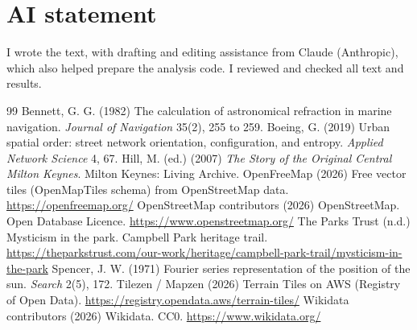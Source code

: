\documentclass[11pt,a4paper]{article}
\begin{document}
\section*{AI statement}
I wrote the text, with drafting and editing assistance from Claude (Anthropic), which also helped prepare the analysis code. I reviewed and checked all text and results.

\begin{thebibliography}{99}
 Bennett, G. G. (1982) The calculation of astronomical refraction in marine navigation. \textit{Journal of Navigation} 35(2), 255 to 259.
 Boeing, G. (2019) Urban spatial order: street network orientation, configuration, and entropy. \textit{Applied Network Science} 4, 67.
 Hill, M. (ed.) (2007) \textit{The Story of the Original Central Milton Keynes}. Milton Keynes: Living Archive.
 OpenFreeMap (2026) Free vector tiles (OpenMapTiles schema) from OpenStreetMap data. \url{https://openfreemap.org/}
 OpenStreetMap contributors (2026) OpenStreetMap. Open Database Licence. \url{https://www.openstreetmap.org/}
 The Parks Trust (n.d.) Mysticism in the park. Campbell Park heritage trail. \url{https://theparkstrust.com/our-work/heritage/campbell-park-trail/mysticism-in-the-park}
 Spencer, J. W. (1971) Fourier series representation of the position of the sun. \textit{Search} 2(5), 172.
 Tilezen / Mapzen (2026) Terrain Tiles on AWS (Registry of Open Data). \url{https://registry.opendata.aws/terrain-tiles/}
 Wikidata contributors (2026) Wikidata. CC0. \url{https://www.wikidata.org/}
\end{thebibliography}
\end{document}
